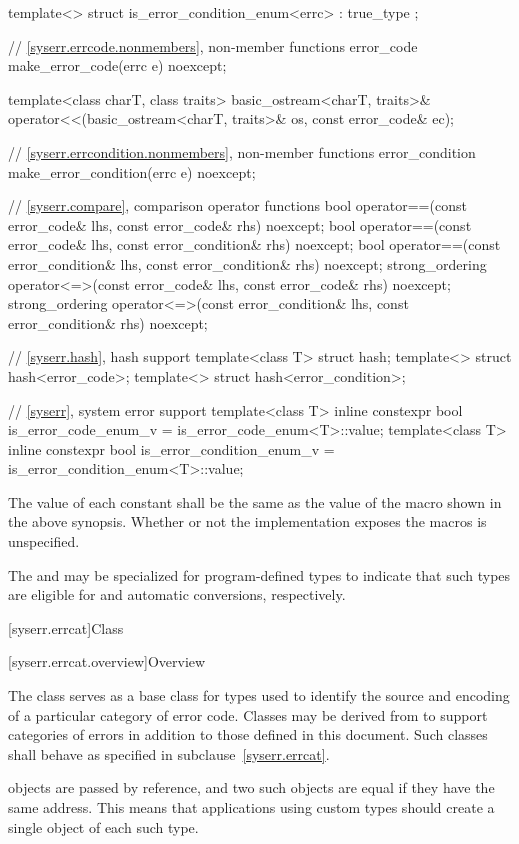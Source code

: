 \begin{codeblock}
{  template<> struct is_error_condition_enum<errc> : true_type {};

  // \ref{syserr.errcode.nonmembers}, non-member functions
  error_code make_error_code(errc e) noexcept;

  template<class charT, class traits>
    basic_ostream<charT, traits>&
      operator<<(basic_ostream<charT, traits>& os, const error_code& ec);

  // \ref{syserr.errcondition.nonmembers}, non-member functions
  error_condition make_error_condition(errc e) noexcept;

  // \ref{syserr.compare}, comparison operator functions
  bool operator==(const error_code& lhs, const error_code& rhs) noexcept;
  bool operator==(const error_code& lhs, const error_condition& rhs) noexcept;
  bool operator==(const error_condition& lhs, const error_condition& rhs) noexcept;
  strong_ordering operator<=>(const error_code& lhs, const error_code& rhs) noexcept;
  strong_ordering operator<=>(const error_condition& lhs, const error_condition& rhs) noexcept;

  // \ref{syserr.hash}, hash support
  template<class T> struct hash;
  template<> struct hash<error_code>;
  template<> struct hash<error_condition>;

  // \ref{syserr}, system error support
  template<class T>
    inline constexpr bool is_error_code_enum_v = is_error_code_enum<T>::value;
  template<class T>
    inline constexpr bool is_error_condition_enum_v = is_error_condition_enum<T>::value;
}
\end{codeblock}

\pnum
The value of each  constant shall be the same as
the value of the  macro shown in the above synopsis.
Whether or not the  implementation
exposes the  macros is unspecified.

\pnum
The  and  may be
specialized for program-defined types to indicate that such types are eligible
for  and  automatic
conversions, respectively.

[syserr.errcat]{Class }

[syserr.errcat.overview]{Overview}

\pnum
The class  serves as a base class for types used
to identify the source and encoding of a particular category of error code.
Classes may be derived from  to support
categories of errors in addition to those defined in this document.
Such classes shall behave as specified in subclause~\ref{syserr.errcat}.
\begin{note}
 objects are
passed by reference, and two such objects
are equal if they have the same address. This means that applications using
custom  types should create a single object of each
such type.
\end{note}

